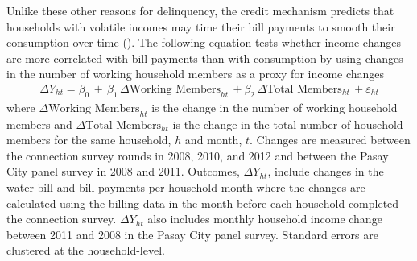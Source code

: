 \documentclass[12pt]{article}
\begin{document}
Unlike these other reasons for delinquency, the credit mechanism predicts that households with volatile incomes may time their bill payments to smooth their consumption over time (\cite{deaton1991saving}).  The following equation tests whether income changes are more correlated with bill payments than with consumption by using changes in the number of working household members as a proxy for income changes
\begin{align*}
\Delta Y_{ht} =\beta_0\,+\, \beta_1\, \Delta \text{Working Members}_{ht} \, + \beta_2\, \Delta \text{Total Members}_{ht}   \,+\varepsilon_{ht}
\end{align*}
where $ \Delta \text{Working Members}_{ht} $ is the change in the number of working household members and $\Delta \text{Total Members}_{ht}$ is the change in the total number of household members for the same household, $h$ and month, $t$.  Changes are measured between the connection survey rounds in 2008, 2010, and 2012 and between the Pasay City panel survey in 2008 and 2011.  Outcomes, $\Delta Y_{ht}$, include changes in the water bill and bill payments per household-month where the changes are calculated using the billing data in the month before each household completed the connection survey.  $\Delta Y_{ht}$ also includes monthly household income change between 2011 and 2008 in the Pasay City panel survey. Standard errors are clustered at the household-level. 
\end{document}
